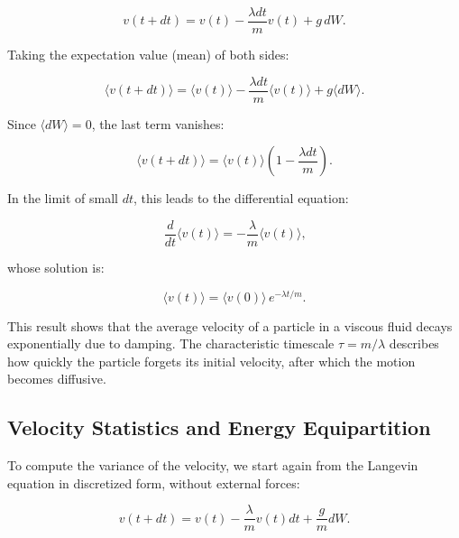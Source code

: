 \begin{equation}
  v(t + dt) = v(t) - \frac{\lambda dt}{m} v(t) + g\, dW\text{.}
  \label{eq:noforce}
\end{equation}

Taking the expectation value (mean) of both sides:

\begin{equation}
  \langle v(t + dt) \rangle = \langle v(t) \rangle - \frac{\lambda dt}{m} \langle v(t) \rangle + g \langle dW \rangle\text{.}
  \label{eq:mean}
\end{equation}

Since $\langle dW \rangle = 0$, the last term vanishes:

\begin{equation}
  \langle v(t + dt) \rangle = \langle v(t) \rangle \left( 1 - \frac{\lambda dt}{m} \right)\text{.}
\end{equation}

In the limit of small $dt$, this leads to the differential equation:

\begin{equation}
  \frac{d}{dt} \langle v(t) \rangle = - \frac{\lambda}{m} \langle v(t) \rangle\text{,}
  \label{eq:derivative}
\end{equation}

whose solution is:

\begin{equation}
  \langle v(t) \rangle = \langle v(0) \rangle\, e^{-\lambda t / m}\text{.}
\end{equation}

This result shows that the average velocity of a particle in a viscous fluid decays exponentially due to damping. The characteristic timescale $\tau = m/\lambda$ describes how quickly the particle forgets its initial velocity, after which the motion becomes diffusive.


\subsection{Velocity Statistics and Energy Equipartition}

To compute the variance of the velocity, we start again from the Langevin equation in discretized form, without external forces:

\begin{equation}
  v(t + dt) = v(t) - \frac{\lambda}{m} v(t) dt + \frac{g}{m} dW \text{.}
\end{equation}


